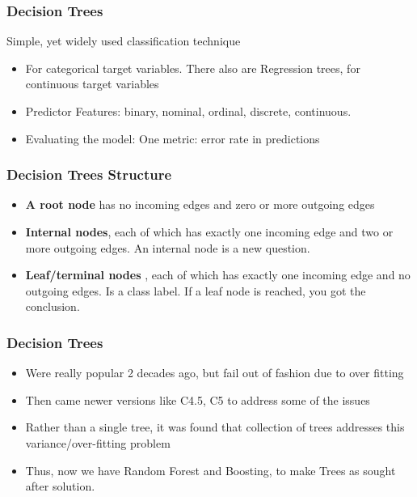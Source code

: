 \begin{frame}[fragile]\frametitle{Decision Trees}
Simple, yet widely used classification technique 

\begin{itemize}
\item For categorical target variables. There also are Regression trees, for continuous target variables
\item Predictor Features: binary, nominal, ordinal, discrete, continuous.
\item Evaluating the model: One metric: error rate in predictions
\end{itemize}
\end{frame}

\begin{frame}[fragile]\frametitle{Decision Trees Structure}
\begin{itemize}
			\item {\bf A root node} has no incoming edges and zero or more outgoing edges
			\item {\bf Internal nodes}, each of which has exactly one incoming edge and 
			two or more outgoing edges. An internal node is a new question.  
			\item{\bf Leaf/terminal nodes} , each of which has exactly one incoming edge
			and no outgoing edges. Is a class label. If a leaf node is reached, you got the
			conclusion. 
\end{itemize}
\end{frame}


\begin{frame}[fragile]\frametitle{Decision Trees}
\begin{itemize}
			\item Were really popular 2 decades ago, but fail out of fashion due to over fitting
			\item Then came newer versions like C4.5, C5 to address some of the issues
			\item Rather than a single tree, it was found that collection of trees addresses this variance/over-fitting problem
			\item Thus, now we have Random Forest and Boosting, to make Trees as sought after solution.
\end{itemize}
\end{frame}

